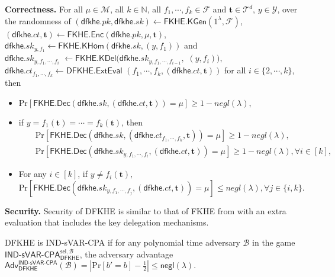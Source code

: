\documentclass[runningheads,10pt]{llncs}
\def\Pr{\mathrm{Pr}}
\begin{document}
\noindent \textbf{Correctness.}
For all $\mu \in \mathcal{M}$, all $k\in \mathbb{N}$, all $f_1, \cdots, f_k\in \mathcal{F}$ and $\mathbf{t} \in \mathcal{T}^d$, $y\in \mathcal{Y}$, 
over the randomness of $(\mathsf{dfkhe}.pk, \mathsf{dfkhe}.sk) \leftarrow \mathsf{FKHE.KGen}(1^\lambda,\mathcal{F} )$, 
$(\mathsf{dfkhe}.ct,\mathbf{t} ) \leftarrow \mathsf{FKHE.Enc}(\mathsf{dfkhe}.pk,  \mu, \mathbf{t} )$, 
$\mathsf{dfkhe}.sk_{y,f_1} \leftarrow \mathsf{FKHE.KHom}(\mathsf{dfkhe}.sk, (y,f_1) )$ and  \\
$\mathsf{dfkhe}.sk_{y, f_1,\cdots, f_{i}}$ $\leftarrow \mathsf{FKHE.KDel}(\mathsf{dfkhe}.sk_{y, f_1,\cdots, f_{i-1}}, $ $(y,  f_{i} )),$  $\mathsf{dfkhe}.ct_{f_1,\cdots, f_k} \leftarrow \mathsf{DFKHE.ExtEval}$ $(f_1,\cdots, f_{k},(\mathsf{dfkhe}.ct,\mathbf{t} ))$ for all $ i\in \{2,\cdots, k\}$, then
 \begin{itemize}
  \item $ \Pr[\mathsf{FKHE.Dec}(\mathsf{dfkhe}.sk, (\mathsf{dfkhe}.ct, \mathbf{t}))=\mu]\geq 1-negl(\lambda),$
\item if $y=f_1(\mathbf{t})=\cdots=f_k(\mathbf{t})$, then
\begin{eqnarray*}
 && \Pr[\mathsf{FKHE.Dec}(\mathsf{dfkhe}.sk, (\mathsf{dfkhe}.ct_{f_1,\cdots, f_k}, \mathbf{t}))=\mu]\geq 1-negl(\lambda),\\
&& \Pr[\mathsf{FKHE.Dec}(\mathsf{dfkhe}.sk_{y,f_1,\cdots, f_i}, (\mathsf{dfkhe}.ct, \mathbf{t}))=\mu]\geq 1-negl(\lambda), \forall i\in [k],
\end{eqnarray*}
\item  For any $ i\in [k]$, if $ y\neq f_i(\mathbf{t}),$ 
\[
 \Pr[\mathsf{FKHE.Dec}(\mathsf{dfkhe}.sk_{y,f_1,\cdots, f_j}, (\mathsf{dfkhe}.ct, \mathbf{t}))=\mu]\leq negl(\lambda), \forall j\in \{i, k\}.
 \]
\end{itemize}


\noindent \textbf{Security.}  Security of DFKHE is similar to that of FKHE from \cite{BGG+14}
with an extra evaluation that includes the key delegation mechanisms. 
\begin{definition}
	DFKHE is IND-sVAR-CPA if for any polynomial time adversary $\mathcal{B}$ in the game $\mathsf{IND}$-$\mathsf{sVAR}$-$\mathsf{CPA}^{\mathsf{sel},\mathcal{B}}_{\mathsf{DFKHE}}$, the adversary advantage  
	$\mathsf{Adv}_{\mathsf{DFKHE}}^{\mathsf{IND}\text{-}\mathsf{sVAR}\text{-}\mathsf{CPA}}(\mathcal{B})=|\Pr[b'=b]-\frac{1}{2}| \leq \mathsf{negl}(\lambda).$
\end{definition}
\end{document}
